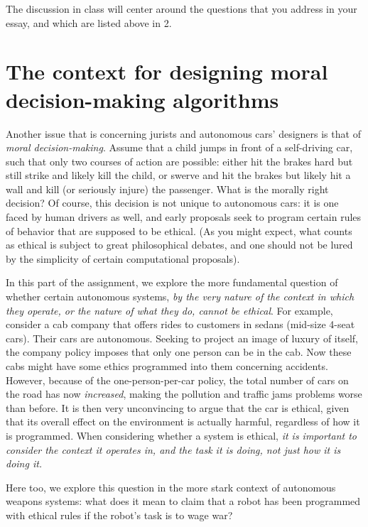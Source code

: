 \documentclass[letta4 paper]{article}
\numberwithin{equation}{section}
\newcommand{\0}{\mathbf{0}}
\begin{document}
	The discussion in class will center around the questions that you address in your essay, and which are listed above in 2.
	
	\section{The context for designing moral decision-making algorithms}
	\label{sec:context}
	Another issue that is concerning jurists and autonomous cars' designers is that of \textit{moral decision-making}. 
	Assume that a child jumps in front of a self-driving car, such that only two courses of action are possible: either hit the brakes hard but still strike and likely kill the child, or swerve and hit the brakes but likely hit a wall and kill (or seriously injure) the passenger. 
	What is the morally right decision?
	Of course, this decision is not unique to autonomous cars: it is one faced by human drivers as well, and early proposals seek to program certain rules of behavior that are supposed to be ethical. (As you might expect, what counts as ethical is subject to great philosophical debates, and one should not be lured by the simplicity of certain computational proposals).
	
	In this part of the assignment, we explore the more fundamental question of whether certain autonomous systems, \textit{by the very nature of the context in which they operate, or the nature of what they do, cannot be ethical}. 
	For example, consider a cab company that offers rides to customers in sedans (mid-size 4-seat cars). 
	Their cars are autonomous.
	Seeking to project an image of luxury of itself, the company policy imposes that only one person can be in the cab.
	Now these cabs might have some ethics programmed into them concerning accidents.
	However, because of the one-person-per-car policy, the total number of cars on the road has now \textit{increased}, making the pollution and traffic jams problems worse than before.
	It is then very unconvincing to argue that the car is ethical,  given that its overall effect on the environment is actually harmful, regardless of how it is programmed.
	When considering whether a system is ethical, \textit{it is important to consider the context it operates in, and the task it is doing, not just how it is doing it.}
	
	Here too, we explore this question in the more stark context of autonomous weapons systems: what does it mean to claim that a robot has been programmed with ethical rules if the robot's task is to wage war?
	
\end{document}
